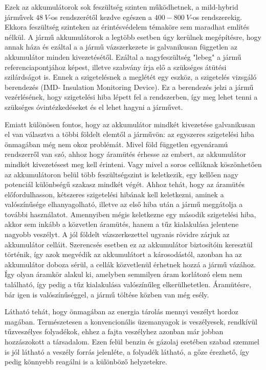 Ezek az akkumulátorok sok feszültség szinten működhetnek, a mild-hybrid járművek $48\ V$-os rendszerétől kezdve egészen a $400-800\ V$-os rendszerekig. Ekkora feszültség szinteken az érintésvédelem témaköre sem maradhat említés nélkül. A jármű akkumulátorok a legtöbb esetben úgy kerülnek megépítésre, hogy annak háza és ezáltal a a jármű vázszerkezete is galvanikusan független az akkumulátor minden kivezetésétől. Ezáltal a nagyfeszültség "lebeg" a jármű referenciapontjához képest, illetve szabvány írja elő a szükséges átütési szilárdságot is. Ennek a szigetelésnek a meglétét egy eszköz, a szigetelés vizsgáló berendezés (IMD- Insulation Monitoring Device). Ez a berendezés jelzi a jármű vezérlésének, hogy szigetelési hiba lépett fel a rendszerben, így meg lehet tenni a szükséges óvintézkedéseket és el lehet hagyni a járművet.

Emiatt különösen fontos, hogy az akkumulátor mindkét kivezetése galvanikusan el van választva a többi földelt elemtől a járművön: az egyszeres szigetelési hiba önmagában még nem okoz problémát. Mivel föld független egyenáramú rendszerről van szó, ahhoz hogy áramütés érhesse az embert, az akkumulátor mindkét kivezetésest meg kell érinteni. Vagy mivel a soros celláknak köszönhetően az akkumulátoron belül több feszültségszint is keletkezik, egy kellően nagy potenciál különbségű szakasz mindkét végét. Ahhoz tehát, hogy az áramütés előfordulhasson, kétszeres szigetelési hibának kell keletkezni, aminek a valószínűsége elhanyagolható, illetve az első hiba után a jármű meggátolja a további használatot. Amennyiben mégis keletkezne egy második szigetelési hiba, akkor sem inkább a közvetlen áramütés, hanem a tűz kialakulása jelentene nagyobb veszélyt. A jól földelt vázszerkezettel ugyanis rövidre zárjuk az akkumulátor celláit. Szerencsés esetben ez az akkumulátor biztosítóin keresztül történik, így azok megvédik az akkumulátort a károsodástól, azonban ha az akkumulátor doboza sérül, a cellák közvetlenül érhetnek hozzá a jármű vázához. Így olyan áramkör alakul ki, amelyben semmilyen áram korlátozó elem nem található, így pedig a tűz kialakulása valószínűleg elkerülhetetlen. Áramütésre, bár igen is valószínűséggel, a jármű töltése közben van még esély.

Látható tehát, hogy önmagában az energia tárolás mennyi veszélyt hordoz magában. Természetesen a konvencionális üzemanyagok is veszélyesek, rendkívül tűzveszélyes folyadékok, ehhez a fajta veszélyhez azonban már jobban hozzászokott a társadalom. Ezen felül benzin és gázolaj esetében szabad szemmel is jól látható a veszély forrás jelenléte, a folyadék látható, a gőze érezhető, így pedig könnyebb reagálni is a különböző helyzetekre.


